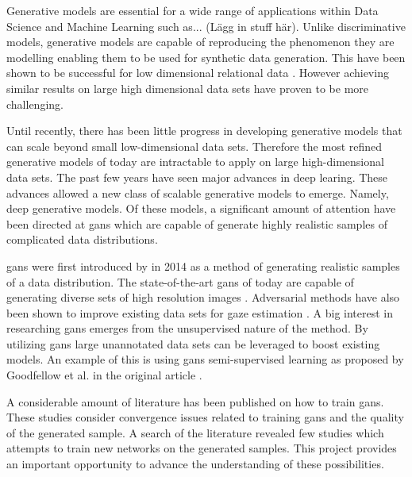 

Generative models are essential for a wide range of applications within Data Science and Machine Learning such as... (Lägg in stuff här). Unlike discriminative models, generative models are capable of reproducing the phenomenon they are modelling enabling them to be used for synthetic data generation. This have been shown to be successful for low dimensional relational data \cite{patki2016synthetic}. However achieving similar results on large high dimensional data sets have proven to be more challenging.

Until recently, there has been little progress in developing generative models that can scale beyond small low-dimensional data sets. Therefore the most refined generative models of today are intractable to apply on large high-dimensional data sets. The past few years have seen major advances in deep learing. These advances allowed a new class of scalable generative models to emerge. Namely, deep generative models. Of these models, a significant amount of attention have been directed at \acrfull{gans} which are capable of generate highly realistic samples of complicated data distributions.

\acrlong{gans} were first introduced by \textcite{goodfellow2014generative} in 2014 as a method of generating realistic samples of a data distribution. The state-of-the-art \acrshort{gans} of today are capable of generating diverse sets of high resolution images \cite{karras2017progressive}. Adversarial methods have also been shown to improve existing data sets for gaze estimation \cite{shrivastava2016learning}. A big interest in researching \acrshort{gans} emerges from the unsupervised nature of the method. By utilizing \acrshort{gans} large unannotated data sets can be leveraged to boost existing models. An example of this is using \acrshort{gans} semi-supervised learning as proposed by Goodfellow et al. in the original article \cite{goodfellow2014generative}.

A considerable amount of literature has been published on how to train \acrshort{gans}. These studies consider convergence issues related to training \acrshort{gans} and the quality of the generated sample. A search of the literature revealed few studies which attempts to train new networks on the generated samples. This project provides an important opportunity to advance the understanding of these possibilities.


